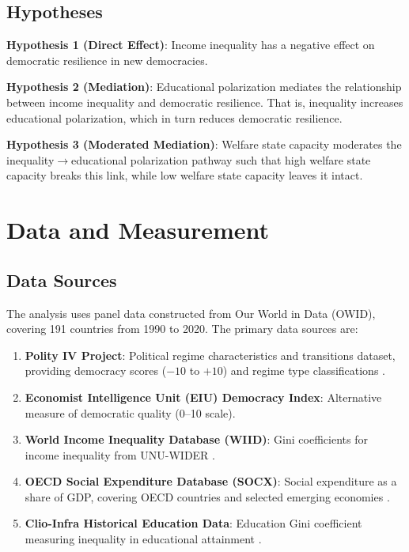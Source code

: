 \documentclass[11pt,letterpaper]{article}
\begin{document}
\subsection{Hypotheses}

\textbf{Hypothesis 1 (Direct Effect)}: Income inequality has a negative effect on democratic resilience in new democracies.

\textbf{Hypothesis 2 (Mediation)}: Educational polarization mediates the relationship between income inequality and democratic resilience. That is, inequality increases educational polarization, which in turn reduces democratic resilience.

\textbf{Hypothesis 3 (Moderated Mediation)}: Welfare state capacity moderates the inequality$\rightarrow$educational polarization pathway such that high welfare state capacity breaks this link, while low welfare state capacity leaves it intact.

\section{Data and Measurement}

\subsection{Data Sources}

The analysis uses panel data constructed from Our World in Data (OWID), covering 191 countries from 1990 to 2020. The primary data sources are:

\begin{enumerate}
\item \textbf{Polity IV Project}: Political regime characteristics and transitions dataset, providing democracy scores ($-10$ to $+10$) and regime type classifications \citep{Marshall2019}.
\item \textbf{Economist Intelligence Unit (EIU) Democracy Index}: Alternative measure of democratic quality (0--10 scale).
\item \textbf{World Income Inequality Database (WIID)}: Gini coefficients for income inequality from UNU-WIDER \citep{UNUWIDER2024}.
\item \textbf{OECD Social Expenditure Database (SOCX)}: Social expenditure as a share of GDP, covering OECD countries and selected emerging economies \citep{OECD2025}.
\item \textbf{Clio-Infra Historical Education Data}: Education Gini coefficient measuring inequality in educational attainment \citep{Thomas2001}.
\end{enumerate}
\end{document}
